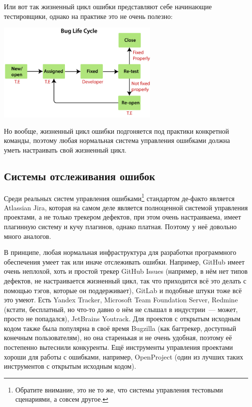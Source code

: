 \documentclass{../../text-style}
\begin{document}
Или вот так жизненный цикл ошибки представляют себе начинающие тестировщики, однако на практике это не очень полезно:

\begin{center}
    \includegraphics[width=0.6\textwidth]{bugLifecycle3.png}
\end{center}

Но вообще, жизненный цикл ошибки подгоняется под практики конкретной команды, поэтому любая нормальная система управления ошибками должна уметь настраивать свой жизненный цикл.

\subsection{Системы отслеживания ошибок}

Среди реальных систем управления ошибками\footnote{Обратите внимание, это не то же, что системы управления тестовыми сценариями, а совсем другое.} стандартом де-факто является Atlassian Jira, которая на самом деле является полноценной системой управления проектами, а не только трекером дефектов, при этом очень настраиваема, имеет плагинную систему и кучу плагинов, однако платная. Поэтому у неё довольно много аналогов. 

В принципе, любая нормальная инфраструктура для разработки программного обеспечения умеет так или иначе отслеживать ошибки. Например, GitHub имеет очень неплохой, хоть и простой трекер GitHub Issues (например, в нём нет типов дефектов, не настраивается жизненный цикл, так что приходится всё это делать с помощью тэгов, которые он поддерживает), GitLab и подобные штуки тоже всё это умеют. Есть Yandex Tracker, Microsoft Team Foundation Server, Redmine (кстати, бесплатный, но что-то давно о нём не слышал в индустрии~--- может, просто не попадался), JetBrains Youtrack. Для проектов с открытым исходным кодом также была популярна в своё время Bugzilla (как багтрекер, доступный конечным пользователям), но она старенькая и не очень удобная, поэтому её постепенно вытеснили конкуренты. Ещё инструменты управления проектами хороши для работы с ошибками, например, OpenProject (один из лучших таких инструментов с открытым исходным кодом).
\end{document}
